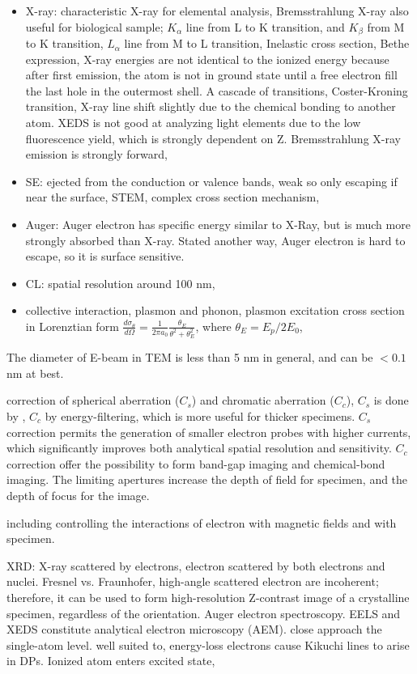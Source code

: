 \begin{itemize}
\item X-ray: characteristic X-ray for elemental analysis, Bremsstrahlung X-ray also useful for biological sample; $K_\alpha$ line from L to K transition, and $K_\beta$ from M to K transition, $L_\alpha$ line from M to L transition, Inelastic cross section, Bethe expression, X-ray energies are not identical to the ionized energy because after first emission, the atom is not in ground state until a free electron fill the last hole in the outermost shell. A cascade of transitions, Coster-Kroning transition, X-ray line shift slightly due to the chemical bonding to another atom. XEDS is not good at analyzing light elements due to the low fluorescence yield, which is strongly dependent on Z. Bremsstrahlung X-ray emission is strongly forward, 
\item SE: ejected from the conduction or valence bands, weak so only escaping if near the surface, STEM, complex cross section mechanism, 
\item Auger: Auger electron has specific energy similar to X-Ray, but is much more strongly absorbed than X-ray. Stated another way, Auger electron is hard to escape, so it is surface sensitive. 
\item CL: spatial resolution around 100 nm, 
\item collective interaction, plasmon and phonon, plasmon excitation cross section in Lorenztian form $\frac{d\sigma_\theta}{d\Omega} = \frac{1}{2\pi a_0} \frac{\theta_E}{\theta^2 + \theta_E^2}$, where $\theta_E = E_p/2E_0$, 
\end{itemize}


The diameter of E-beam in TEM is less than 5 nm in general, and can be $< 0.1$ nm at best.

correction of spherical aberration ($C_s$) and chromatic aberration ($C_c$), $C_s$ is done by , $C_c$ by energy-filtering, which is more useful for thicker specimens. $C_s$ correction permits the generation of smaller electron probes with higher currents, which significantly improves both analytical spatial resolution and sensitivity. $C_c$ correction offer the possibility to form band-gap imaging and chemical-bond imaging. The limiting apertures increase the depth of field for specimen, and the depth of focus for the image.\cite{Williams2009} 

including controlling the interactions of electron with magnetic fields and with specimen.  

XRD: X-ray scattered by electrons, electron scattered by both electrons and nuclei. Fresnel vs. Fraunhofer, high-angle scattered electron are incoherent; therefore, it can be used to form high-resolution Z-contrast image of a crystalline specimen, regardless of the orientation. Auger electron spectroscopy. EELS and XEDS constitute analytical electron microscopy (AEM). close approach the single-atom level. well suited to, energy-loss electrons cause Kikuchi lines to arise in DPs. Ionized atom enters excited state, 

